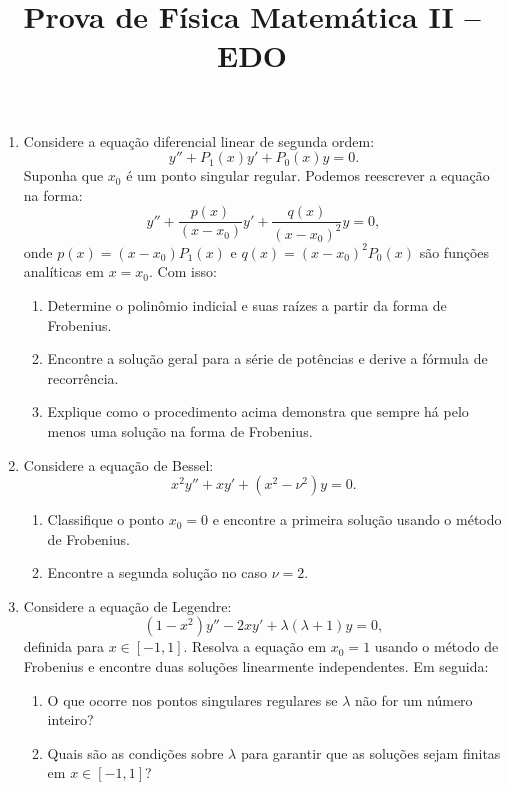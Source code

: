 \newif\ifuseseminar
\useseminartrue


\title{Prova de Física Matemática II -- EDO}


\begin{enumerate}
	\item Considere a equação diferencial linear de segunda ordem:
	      $$y'' + P_1(x)y' + P_0(x)y = 0.$$
	      Suponha que $x_0$ é um ponto singular regular. Podemos reescrever a equação na forma:
	      $$y'' + \frac{p(x)}{(x - x_0)}y' + \frac{q(x)}{(x - x_0)^2}y = 0,$$
	      onde $p(x) = (x - x_0)P_1(x)$ e $q(x) = (x - x_0)^2P_0(x)$ são funções analíticas em $x = x_0$. Com isso:
	      \begin{enumerate}
		      \item Determine o polinômio indicial e suas raízes a partir da forma de Frobenius.
		      \item Encontre a solução geral para a série de potências e derive a fórmula de recorrência.
		      \item Explique como o procedimento acima demonstra que sempre há pelo menos uma solução na forma de Frobenius.
	      \end{enumerate}
	\item Considere a equação de Bessel:
	      \[x^2y'' + xy' + (x^2 - \nu^2)y = 0.\]
	      \begin{enumerate}
		      \item Classifique o ponto $x_0 = 0$ e encontre a primeira solução usando o método de Frobenius.
		      \item Encontre a segunda solução no caso $\nu = 2$.
	      \end{enumerate}

	\item Considere a equação de Legendre:
	      $$
		      (1 - x^2)y'' - 2xy' + \lambda(\lambda + 1)y = 0,
	      $$
	      definida para $x \in [-1,1]$. Resolva a equação em $x_0 = 1$ usando o método
	      de Frobenius e encontre duas soluções linearmente independentes. Em seguida:
	      \begin{enumerate}
		      \item O que ocorre nos pontos singulares regulares se $\lambda$ não for um
		            número inteiro?
		      \item Quais são as condições sobre $\lambda$ para garantir que as soluções
		            sejam finitas em $x \in [-1,1]$?
	      \end{enumerate}
\end{enumerate}


